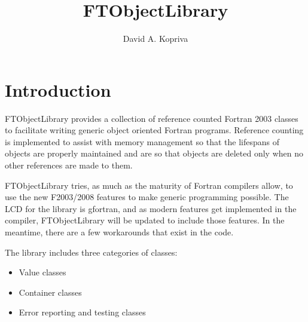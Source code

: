 \documentclass[9pt]{article}
\title{FTObjectLibrary}
\author{David A. Kopriva}
\date{}                                           %
\begin{document}
\maketitle
\tableofcontents{}
\section{Introduction}
  FTObjectLibrary provides a collection of reference counted Fortran 2003 classes to 
 facilitate writing generic object oriented Fortran programs. Reference counting
 is implemented to assist with memory management so that the lifespans of objects
 are properly maintained and are so that objects are deleted only when no other references are made to them.


 FTObjectLibrary tries, as much as the maturity of Fortran compilers allow, to
 use the new F2003/2008 features to make generic programming possible. The LCD
 for the library is gfortran, and as modern features get implemented in the
 compiler, FTObjectLibrary will be updated to include those features. In the meantime, there
 are a few workarounds that exist in the code.


 The library includes
 three categories of classes:
 \begin{itemize}
\item Value classes
\item Container classes
\item Error reporting and testing classes
\end{itemize}
\end{document}
